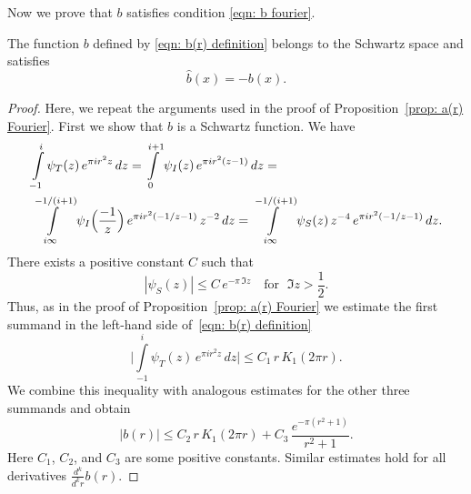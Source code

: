   Now we prove that $b$ satisfies condition \eqref{eqn: b fourier}.
  \begin{proposition}\label{prop: b(r) Fourier}
  The function $b$ defined by \eqref{eqn: b(r) definition} belongs to the Schwartz space and satisfies
    $$\widehat{b}(x)=-b(x). $$
  \end{proposition}
  \begin{proof}
  Here, we repeat the arguments used in the proof of Proposition~\ref{prop: a(r) Fourier}. First we show that $b$ is a Schwartz function. We have
  \begin{align}
   &\int\limits_{-1}^{i}\psi_T(z)\,e^{\pi i r^2 z}\,dz=\int\limits_{0}^{i+1}\psi_I(z)\,e^{\pi i r^2 (z-1)}\,dz=\notag\\
   &\int\limits_{i\infty}^{-1/(i+1)}\psi_I\Big(\frac{-1}{z}\Big)\,e^{\pi i r^2 (-1/z-1)}\,z^{-2}\,dz=\int\limits_{i\infty}^{-1/(i+1)}\psi_S(z)\,z^{-4}\,e^{\pi i r^2 (-1/z-1)}\,dz.\notag
  \end{align}
  There exists a positive constant $C$ such that
  $$|\psi_S(z)|\leq C\,e^{-\pi\,\Im{z}}\quad\mbox{for }\;\Im{z}>\frac12.$$
  Thus, as in the proof of Proposition~\ref{prop: a(r) Fourier} we estimate the first summand in the left-hand side of~\eqref{eqn: b(r) definition}
  $$\Bigg|\int\limits_{-1}^i \psi_T(z)\,e^{\pi i r^2 z}\,dz \Bigg|\leq C_1\,r\,K_1(2\pi r).$$
  We combine this inequality with analogous estimates for the other three summands and obtain
  $$|b(r)|\leq C_2\,r\,K_1(2\pi r)+C_3\,\frac{e^{-\pi(r^2+1)}}{r^2+1}.$$
  Here $C_1$, $C_2$, and $C_3$ are some positive constants. Similar estimates hold for all derivatives $\frac{d^k}{d^k r} b(r)$.


\end{proof}
